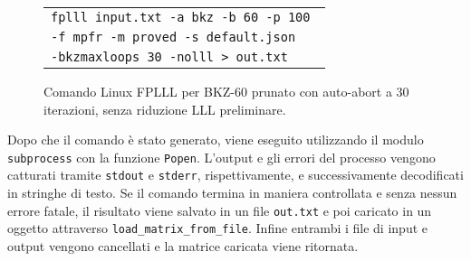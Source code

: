 \begin{figure}[h]
    \centering
    \begin{tabular}{l}
        \texttt{fplll input.txt -a bkz -b 60 -p 100 } \\
        \texttt{-f mpfr -m proved -s default.json} \\
        \texttt{-bkzmaxloops 30 -nolll > out.txt}
    \end{tabular}
    \caption{Comando Linux FPLLL per BKZ-60 prunato con auto-abort a 30 iterazioni, 
    senza riduzione LLL preliminare.}
    \label{fig:bkzcommand2}
\end{figure}

Dopo che il comando è stato generato, viene eseguito utilizzando il modulo \texttt{subprocess}
con la funzione \texttt{Popen}. 
L'output e gli errori del processo vengono catturati tramite \texttt{stdout} e \texttt{stderr}, 
rispettivamente, e successivamente decodificati in stringhe di testo.
Se il comando termina in maniera controllata e senza nessun errore fatale, il risultato
viene salvato in un file \texttt{out.txt} e poi caricato in un oggetto attraverso
\texttt{load\_matrix\_from\_file}. 
Infine entrambi i file di input e output vengono cancellati e la matrice caricata viene
ritornata. 
